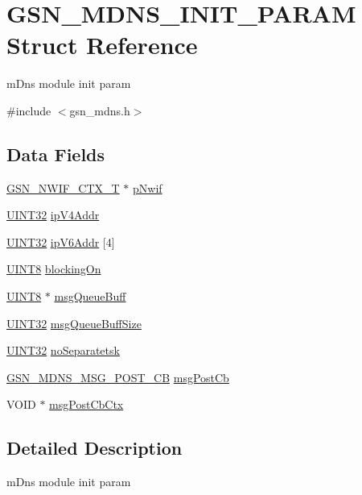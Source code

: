 \hypertarget{a00144}{
\section{GSN\_\-MDNS\_\-INIT\_\-PARAM Struct Reference}
\label{a00144}
}


mDns module init param  




{\ttfamily \#include $<$gsn\_\-mdns.h$>$}

\subsection*{Data Fields}
\begin{DoxyCompactItemize}
\item 
\hyperlink{a00167}{GSN\_\-NWIF\_\-CTX\_\-T} $\ast$ \hyperlink{a00144_a98d510676ecd134a5e9ac61bf222cded}{pNwif}
\item 
\hyperlink{a00660_gae1e6edbbc26d6fbc71a90190d0266018}{UINT32} \hyperlink{a00144_a62b6631d984cc1ac01c45f3a4891520c}{ipV4Addr}
\item 
\hyperlink{a00660_gae1e6edbbc26d6fbc71a90190d0266018}{UINT32} \hyperlink{a00144_aefd5b2db3c171f6f8eeeb613e7eaf709}{ipV6Addr} \mbox{[}4\mbox{]}
\item 
\hyperlink{a00660_gab27e9918b538ce9d8ca692479b375b6a}{UINT8} \hyperlink{a00144_ae88d491fc834aaae7cc9c066719d285b}{blockingOn}
\item 
\hyperlink{a00660_gab27e9918b538ce9d8ca692479b375b6a}{UINT8} $\ast$ \hyperlink{a00144_a7e51f5f5131592004e739bcc100a27fc}{msgQueueBuff}
\item 
\hyperlink{a00660_gae1e6edbbc26d6fbc71a90190d0266018}{UINT32} \hyperlink{a00144_a21640f5a1df0caa651f4ffe4280d6210}{msgQueueBuffSize}
\item 
\hyperlink{a00660_gae1e6edbbc26d6fbc71a90190d0266018}{UINT32} \hyperlink{a00144_a8d3f646fa21e09b46466bac533ff66e7}{noSeparatetsk}
\item 
\hyperlink{a00668_ga9bb465f57992212c58689c8cf593e0e7}{GSN\_\-MDNS\_\-MSG\_\-POST\_\-CB} \hyperlink{a00144_a6adb3a11c7d8acfbd87e34dca64c8117}{msgPostCb}
\item 
VOID $\ast$ \hyperlink{a00144_ae2825f88703448135895148a789564ed}{msgPostCbCtx}
\end{DoxyCompactItemize}


\subsection{Detailed Description}
mDns module init param 

